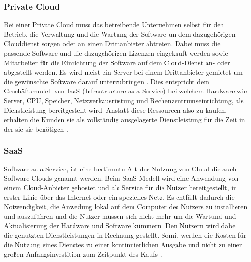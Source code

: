 \documentclass[12pt,bibtotoc]{article}
\begin{document}
		\subsubsection{Private Cloud}
		Bei einer Private Cloud muss das betreibende Unternehmen selbst für den Betrieb, die Verwaltung und die Wartung der Software un dem dazugehörigen Clouddienst sorgen oder an einen Drittanbieter abtreten.
		Dabei muss die passende Software und die dazugehörigen Lizenzen eingekauft werden sowie Mitarbeiter für die Einrichtung der Software auf dem Cloud-Dienst an- oder abgestellt werden.
	Es wird meist ein Server bei einem Drittanbieter gemietet um die gewünschte Software darauf unterzubringen \cite{Anhang}. \newline
		Dies entspricht dem Geschäftsmodell von IaaS (Infrastructure as a Service) bei welchem Hardware wie Server, CPU, Speicher, Netzwerkausrüstung und Rechenzentrumseinrichtung, als Dienstleistung bereitgestellt wird.
		Anstatt diese Ressourcen also zu kaufen, erhalten die Kunden sie als vollständig ausgelagerte Dienstleistung für die Zeit in der sie sie benötigen \cite{Murugesan.2016}.
		\subsubsection{SaaS}
		Software as a Service, ist eine bestimmte Art der Nutzung von Cloud die auch Software-Clouds genannt werden. 
		Beim SaaS-Modell wird eine Anwendung von einem Cloud-Anbieter gehostet und als Service für die Nutzer bereitgestellt, in erster Linie über das Internet oder ein spezielles Netz.
		Es entfällt dadurch die Notwendigkeit, die Anwedung lokal auf dem Computer des Nutzers zu installieren und auszuführen und die Nutzer müssen sich nicht mehr um die Wartund und Aktualisierung der Hardware und Software kümmern.
		Den Nutzern wird dabei die genutzten Dienstleistungen in Rechnung gestellt. Somit werden die Kosten für die Nutzung eines Dienstes zu einer kontinuierlichen Ausgabe und nicht zu einer großen Anfangsinvestition zum Zeitpunkt des Kaufs \cite{Murugesan.2016}.
		
\end{document}
